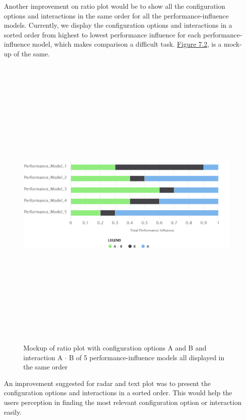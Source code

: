 Another improvement on ratio plot would be to show all the configuration options and interactions in the same order for all the performance-influence models. Currently, we display the configuration options and interactions in a sorted order from highest to lowest performance influence for each performance-influence model, which makes comparison a difficult task.  \hyperref[sameOrder]{Figure 7.2}, is a mock-up of the same.

\begin{figure}[ht]
\centering
\label{sameOrder}
\includegraphics[width=15cm,height=15cm,keepaspectratio,]{pics/ratio_plot_without_sorted_order.pdf}
\caption[mockup2]{Mockup of ratio plot with configuration options A and B and interaction A $\cdot$ B of 5 performance-influence models all displayed in the same order}
\end{figure}


An improvement suggested for radar and text plot was to present the configuration options and interactions in a sorted order. This would help the users perception in finding the most relevant configuration option or interaction easily.

